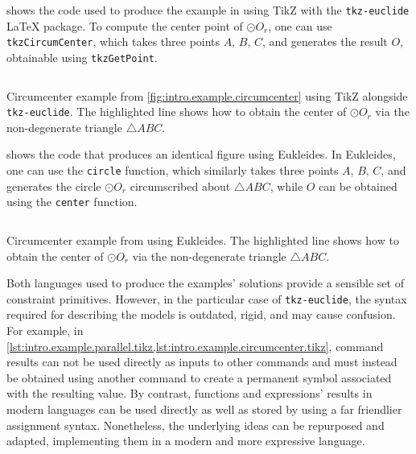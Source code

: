  shows the code used to produce the
example in  using \acs{TikZ} with the
\texttt{tkz-euclide} \LaTeX{} package.  To compute the center point of $\odot
O_r$, one can use \texttt{tkzCircumCenter}, which takes three points
$A,\,B,\,C$, and generates the result $O$, obtainable using
\texttt{tkzGetPoint}.

\begin{listing}[htb]
  \inputminted[highlightlines=3]{latex}{tikz/ex-circumcenter.tex}
  \caption[Circumcenter example using \acs{TikZ}]{
    Circumcenter example from \cref{fig:intro.example.circumcenter} using
    \acs{TikZ} alongside \texttt{tkz-euclide}.  The highlighted line shows how
    to obtain the center of $\odot O_r$ via the non-degenerate triangle
    $\triangle ABC$.}%
  \label{lst:intro.example.circumcenter.tikz}
\end{listing}

 shows the code
that produces an identical figure using Eukleides.  In Eukleides, one can use
the \texttt{circle} function, which similarly takes three points $A,\,B,\,C$,
and generates the circle $\odot O_r$ circumscribed about $\triangle ABC$, while
$O$ can be obtained using the \texttt{center} function.

\begin{listing}[htb]
  \inputminted[highlightlines=2]{text}{euk/ex-circumcenter.euk}
  \caption[Circumcenter example using Eukleides]{
    Circumcenter example from  using
    Eukleides.  The highlighted line shows how to obtain the center of $\odot
    O_r$ via the non-degenerate triangle $\triangle ABC$.}%
  \label{lst:intro.example.circumcenter.euk}
\end{listing}

Both languages used to produce the examples' solutions provide a sensible set of
constraint primitives.  However, in the particular case of \texttt{tkz-euclide},
the syntax required for describing the models is outdated, rigid, and may cause
confusion.  For example, in
\cref{lst:intro.example.parallel.tikz,lst:intro.example.circumcenter.tikz},
command results can not be used directly as inputs to other commands and must
instead be obtained using another command to create a permanent symbol
associated with the resulting value.  By contrast, functions and expressions'
results in modern languages can be used directly as well as stored by using a
far friendlier assignment syntax.  Nonetheless, the underlying ideas can be
repurposed and adapted, implementing them in a modern and more expressive
language.
